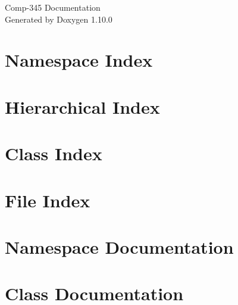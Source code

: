 \documentclass[twoside]{book}
\newcommand{\+}{\discretionary{\mbox{\scriptsize$\hookleftarrow$}}{}{}}
\newcommand{\clearemptydoublepage}{%
    \newpage{\pagestyle{empty}\cleardoublepage}%
  }
\begin{document}
  \raggedbottom
    \hypersetup{pageanchor=false,
                bookmarksnumbered=true,
                pdfencoding=unicode
               }
  \begin{titlepage}
  \vspace*{7cm}
  \begin{center}%
  {\Large Comp-\/345 Documentation}\\
  \vspace*{1cm}
  {\large Generated by Doxygen 1.10.0}\\
  \end{center}
  \end{titlepage}
  \clearemptydoublepage
  \tableofcontents
  \clearemptydoublepage
  \hypersetup{pageanchor=true}

\chapter{Namespace Index}

\chapter{Hierarchical Index}

\chapter{Class Index}

\chapter{File Index}

\chapter{Namespace Documentation}

\chapter{Class Documentation}














\end{document}
